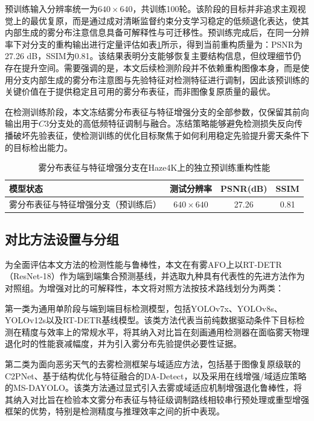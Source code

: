 预训练输入分辨率统一为$640\times640$，共训练100轮。该阶段的目标并非追求主观视觉上的最优复原，而是通过成对清晰监督约束分支学习稳定的低频退化表达，使其内部生成的雾分布注意信息具备可解释性与可迁移性。预训练完成后，在同一分辨率下对分支的重构输出进行定量评估如表\ref{tab:fog_pretrain_psnr_ssim}所示，得到当前重构质量为：PSNR为27.26 dB，SSIM为0.81。该结果表明分支能够恢复主要结构信息，但纹理细节仍存在提升空间。需要强调的是，本文后续检测阶段并不依赖重构图像本身，而是使用分支内部生成的雾分布注意图与先验特征对检测特征进行调制，因此该预训练的关键价值在于提供稳定且可用的雾分布表征，而非图像复原质量的最优。

在检测训练阶段，本文冻结雾分布表征与特征增强分支的全部参数，仅保留其前向输出用于$C3$分支处的高低频特征调制与融合。冻结策略能够避免检测损失反向传播破坏先验表征，使检测训练的优化目标聚焦于如何利用稳定先验提升雾天条件下的目标检出能力。

\begin{table}[!htbp]
\centering
\caption{雾分布表征与特征增强分支在Haze4K上的独立预训练重构性能}
\label{tab:fog_pretrain_psnr_ssim}
\begin{tabular}{l c c c}
\hline
模型状态 & 测试分辨率 & PSNR(dB) & SSIM \\
\hline
雾分布表征与特征增强分支（预训练后） & $640\times640$ & 27.26 & 0.81 \\
\hline
\end{tabular}
\end{table}

\subsection{对比方法设置与分组}
\label{subsec:cmp_models}

为全面评估本文方法的检测性能与鲁棒性，本文在有雾AFO上以RT-DETR（ResNet-18）作为端到端集合预测基线，并选取九种具有代表性的先进方法作为对照组。为增强对比的可解释性，本文将对照方法按技术路线划分为两类：

第一类为通用单阶段与端到端目标检测模型，包括YOLOv7x、YOLOv8s、YOLOv12s以及RT-DETR基线模型。该类方法代表当前纯数据驱动条件下目标检测在精度与效率上的常规水平，将其纳入对比旨在刻画通用检测器在面临雾天物理退化时的性能衰减幅度，并为引入雾分布先验提供必要性证据。

第二类为面向恶劣天气的去雾检测框架与域适应方法，包括基于图像复原级联的C2PNet、基于结构优化与特征融合的DA-Detect，以及采用在线增强/域适应策略的MS-DAYOLO。该类方法通过显式引入去雾或域适应机制增强退化鲁棒性，将其纳入对比旨在检验本文雾分布表征与特征级调制路线相较串行预处理或重型增强框架的优势，特别是检测精度与推理效率之间的折中表现。


